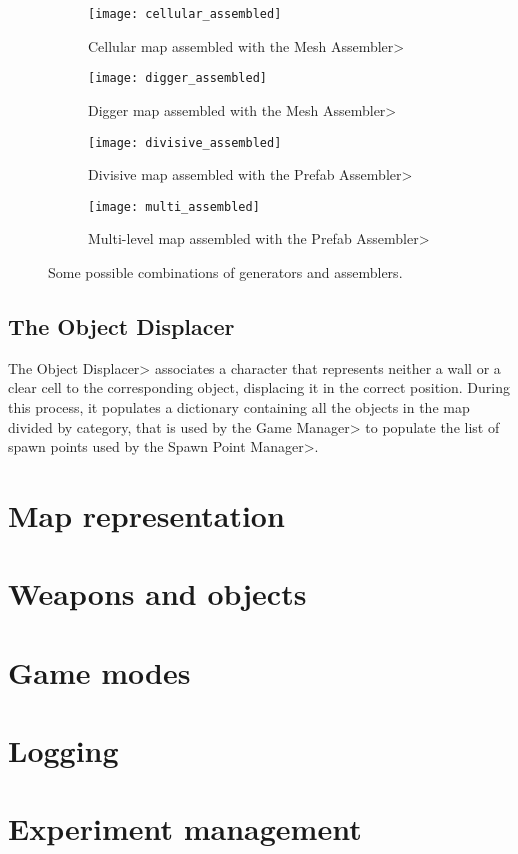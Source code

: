 \begin{figure}[tp]
\centering
\begin{subfigure}[t]{0.48\linewidth}
\texttt{[image: cellular\_assembled]}
\caption{Cellular map assembled with the \<Mesh Assembler>}
\label{fig:cellular_assembled}
\end{subfigure}
\begin{subfigure}[t]{0.48\linewidth}
\texttt{[image: digger\_assembled]}
\caption{Digger map assembled with the \<Mesh Assembler>}
\label{fig:digger_assembled}
\end{subfigure}
\begin{subfigure}[t]{0.48\linewidth}
\texttt{[image: divisive\_assembled]}
\caption{Divisive map assembled with the \<Prefab Assembler>}
\label{fig:divisive_assembled}
\end{subfigure}
\begin{subfigure}[t]{0.48\linewidth}
\texttt{[image: multi\_assembled]}
\caption{Multi-level map assembled with the \<Prefab Assembler>}
\label{fig:multi_assembled}
\end{subfigure}
\caption{Some possible combinations of generators and assemblers.}
\end{figure}


\subsection{The Object Displacer}

The \<Object Displacer> associates a character that represents neither a wall or a clear cell to the corresponding object, displacing it in the correct position. During this process, it populates a dictionary containing all the objects in the map divided by category, that is used by the \<Game Manager> to populate the list of spawn points used by the \<Spawn Point Manager>.


\section{Map representation}


\section{Weapons and objects}


\section{Game modes}


\section{Logging}


\section{Experiment management}

